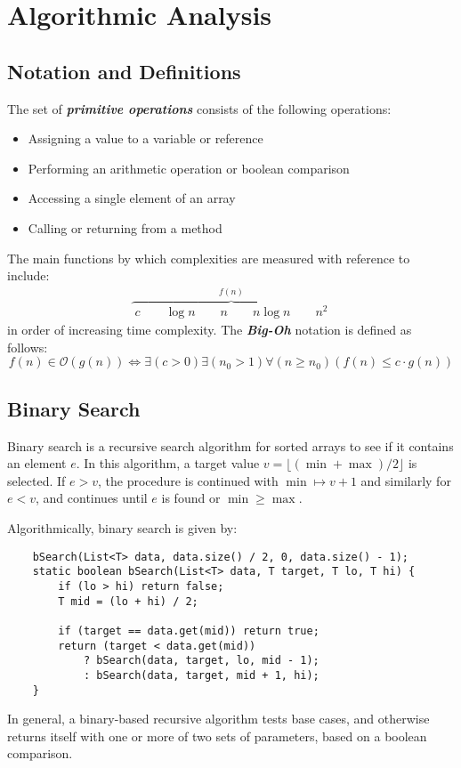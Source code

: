 \documentclass[12pt, letterpaper]{article}
\begin{document}
\newpage
\section{Algorithmic Analysis}

\subsection{Notation and Definitions}
The set of \textbf{\textit{primitive operations}} consists of the following operations:
\begin{itemize}
    \item Assigning a value to a variable or reference
    \item Performing an arithmetic operation or boolean comparison
    \item Accessing a single element of an array
    \item Calling or returning from a method
\end{itemize}

The main functions by which complexities are measured with reference to include:
\begin{align*}
    \overbrace{\;c \qquad \log n \qquad n \qquad n \log n \qquad n^2\;}^{f(n)}
\end{align*}
in order of increasing time complexity.
\bigskip
The \textbf{\textit{Big-Oh}} notation is defined as follows:
\begin{equation}
    f(n) \in \mathcal O(g(n)) \iff \exists (c > 0) \exists (n_0 > 1) \forall (n  \geq n_0)(f(n) \leq c \cdot g(n))
\end{equation}

\subsection{Binary Search }
Binary search is a recursive search algorithm for sorted arrays to see if it contains an element $e$. In this algorithm, a target value $v = \lfloor (\min + \max) /2 \rfloor$ is selected. If $e > v$, the procedure is continued with $\min \mapsto v + 1$ and similarly for $e < v$, and continues until $e$ is found or $\min \geq \max$.

\bigskip
Algorithmically, binary search is given by:
\begin{verbatim}
    bSearch(List<T> data, data.size() / 2, 0, data.size() - 1);
    static boolean bSearch(List<T> data, T target, T lo, T hi) {
        if (lo > hi) return false;
        T mid = (lo + hi) / 2;

        if (target == data.get(mid)) return true;
        return (target < data.get(mid))
            ? bSearch(data, target, lo, mid - 1);
            : bSearch(data, target, mid + 1, hi);
    }
\end{verbatim}
In general, a binary-based recursive algorithm tests base cases, and otherwise returns itself with one or more of two sets of parameters, based on a boolean comparison.
\end{document}
